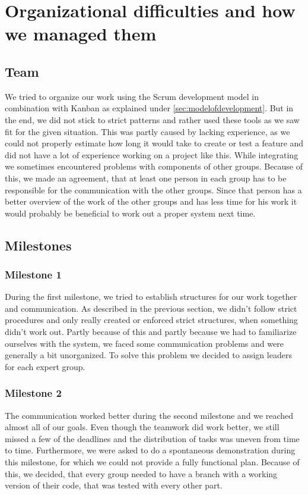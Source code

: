 \documentclass[main.tex]{subfiles}
\begin{document}
	\begingroup

	\renewcommand{\cleardoublepage}{}

	\renewcommand{\clearpage}{}

	\chapter{Organizational difficulties and how we managed them}

		
		\section{Team}
		We tried to organize our work using the Scrum development model in combination with Kanban as explained under \ref{sec:modelofdevelopment}. But in the end, we did not stick to strict patterns and rather used these tools as we saw fit for the given situation. This was partly caused by lacking experience, as we could not properly estimate how long it would take to create or test a feature and did not have a lot of experience working on a project like this.
		While integrating we sometimes encountered problems with components of other groups. Because of this, we made an agreement, that at least one person in each group has to be responsible for the communication with the other groups. Since that person has a better overview of the work of the other groups and has less time for his work it would probably be beneficial to work out a proper system next time.
		
		\section{Milestones}
		
		\subsection{Milestone 1}
		During the first milestone, we tried to establish structures for our work together and communication. As described in the previous section, we didn't follow strict procedures and only really created or enforced strict structures, when something didn't work out. Partly because of this and partly because we had to familiarize ourselves with the system, we faced some communication problems and were generally a bit unorganized. To solve this problem we decided to assign leaders for each expert group.
		
		\subsection{Milestone 2}
		The communication worked better during the second milestone and we reached almost all of our goals. Even though the teamwork did work better, we still missed a few of the deadlines and the distribution of tasks was uneven from time to time. Furthermore, we were asked to do a spontaneous demonstration during this milestone, for which we could not provide a fully functional plan. Because of this, we decided, that every group needed to have a branch with a working version of their code, that was tested with every other part.
		
\end{document}
